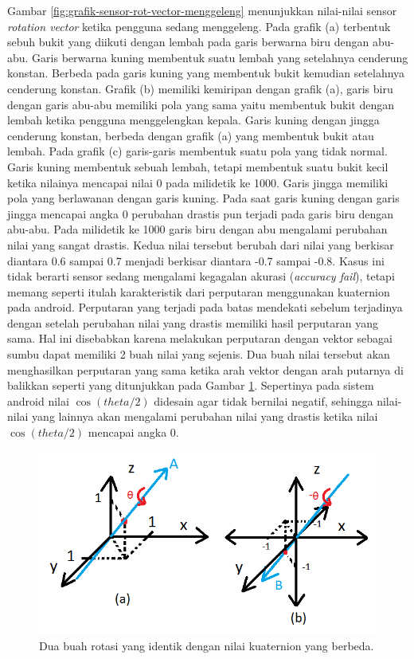 \documentclass[a4paper,twoside]{article}
\begin{document}
\begin{enumerate}
Gambar \ref{fig:grafik-sensor-rot-vector-menggeleng} menunjukkan nilai-nilai sensor \textit{rotation vector} ketika pengguna sedang menggeleng. Pada grafik (a) terbentuk sebuh bukit yang diikuti dengan lembah pada garis berwarna biru dengan abu-abu. Garis berwarna kuning membentuk suatu lembah yang setelahnya cenderung konstan. Berbeda pada garis kuning yang membentuk bukit kemudian setelahnya cenderung konstan. Grafik (b) memiliki kemiripan dengan grafik (a), garis biru dengan garis abu-abu memiliki pola yang sama yaitu membentuk bukit dengan lembah ketika pengguna menggelengkan kepala. Garis kuning dengan jingga cenderung konstan, berbeda dengan grafik (a) yang membentuk bukit atau lembah. Pada grafik (c) garis-garis membentuk suatu pola yang tidak normal. Garis kuning membentuk sebuah lembah, tetapi membentuk suatu bukit kecil ketika nilainya mencapai nilai 0 pada milidetik ke 1000. Garis jingga memiliki pola yang berlawanan dengan garis kuning. Pada saat garis kuning dengan garis jingga mencapai angka 0 perubahan drastis pun terjadi pada garis biru dengan abu-abu. Pada milidetik ke 1000 garis biru dengan abu mengalami perubahan nilai yang sangat drastis. Kedua nilai tersebut berubah dari nilai yang berkisar diantara 0.6 sampai 0.7 menjadi berkisar diantara -0.7 sampai -0.8. Kasus ini tidak berarti sensor sedang mengalami kegagalan akurasi (\textit{accuracy fail}), tetapi memang seperti itulah karakteristik dari perputaran menggunakan kuaternion pada android. Perputaran yang terjadi pada batas mendekati sebelum terjadinya dengan setelah perubahan nilai yang drastis memiliki hasil perputaran yang sama. Hal ini disebabkan karena melakukan perputaran dengan vektor sebagai sumbu dapat memiliki 2 buah nilai yang sejenis. Dua buah nilai tersebut akan menghasilkan perputaran yang sama ketika arah vektor dengan arah putarnya di balikkan seperti yang ditunjukkan pada Gambar \ref{fig:penjelasan-perputaran-quaternion-android-sensor}. Sepertinya pada sistem android nilai $\cos (theta/2)$ didesain agar tidak bernilai negatif, sehingga nilai-nilai yang lainnya akan mengalami perubahan nilai yang drastis ketika nilai $\cos (theta/2)$ mencapai angka 0.

\begin{figure}[htbp]
\centering
\includegraphics[scale=0.6]{Gambar/penjelasan-perputaran-quaternion-android-sensor.png}
\caption{Dua buah rotasi yang identik dengan nilai kuaternion yang berbeda.} 
\label{fig:penjelasan-perputaran-quaternion-android-sensor}
\end{figure}



\end{enumerate}
\end{document}
